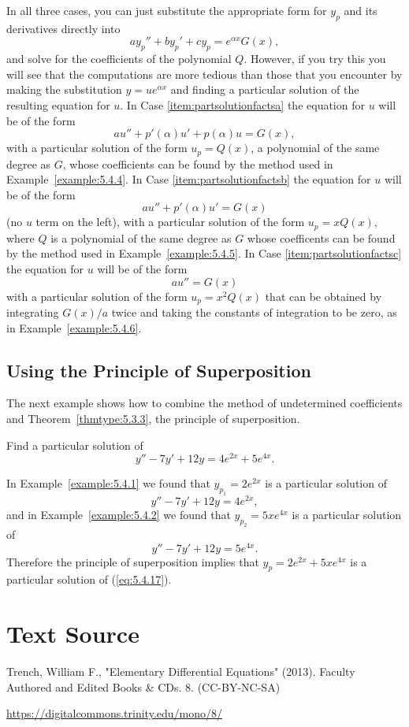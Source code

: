 \documentclass{ximera}
\begin{document}
In all three cases, you can just substitute the appropriate form for
$y_p$ and its derivatives directly into
$$
ay_p''+by_p'+cy_p=e^{\alpha x}G(x),
$$
and solve for the coefficients of the polynomial $Q$. However, if you
try this you will see that the computations are more tedious than
those that you encounter by making the substitution $y=ue^{\alpha x}$
and finding a particular solution of the resulting equation for $u$.
In Case \ref{item:partsolutionfactsa}
the equation for $u$ will be of the form
$$
au''+p'(\alpha)u'+p(\alpha)u=G(x),
$$
with a particular solution of the form $u_p=Q(x)$, a polynomial of the
same degree as $G$, whose coefficients can be found by the method used
in Example~\ref{example:5.4.4}. In Case \ref{item:partsolutionfactsb}  the equation for
$u$ will be of the form
$$
au''+p'(\alpha)u'=G(x)
$$
(no $u$ term on the left), with a particular solution of the form
$u_p=xQ(x)$, where $Q$ is a polynomial of the same degree as $G$ whose
coefficents can be found by the method used in
Example~\ref{example:5.4.5}. In Case \ref{item:partsolutionfactsc}  the equation for $u$
will be of the form
$$
au''=G(x)
$$
with a particular solution of the form $u_p=x^2Q(x)$ that can be
obtained by integrating $G(x)/a$ twice and taking the constants of
integration to be zero, as in Example~\ref{example:5.4.6}.

\subsection*{Using the Principle of Superposition}

The next example shows how to combine the method of undetermined
coefficients and Theorem~\ref{thmtype:5.3.3}, the principle of
superposition.

\begin{example}\label{example:5.4.7}
Find a particular solution of
\begin{equation} \label{eq:5.4.17}
y''-7y'+12y=4e^{2x}+5e^{4x}.
\end{equation}


\begin{explanation}
In Example~\ref{example:5.4.1} we found that $y_{p_1}=2e^{2x}$
is a particular solution of
$$
y''-7y'+12y=4e^{2x},
$$
and in Example~\ref{example:5.4.2} we found that $y_{p_2}=5xe^{4x}$
is a particular solution of
$$
y''-7y'+12y=5e^{4x}.
$$
Therefore the principle of superposition implies that
$y_p=2e^{2x}+5xe^{4x}$ is a particular solution of (\ref{eq:5.4.17}).
\end{explanation}
\end{example}
\section*{Text Source}
Trench, William F., "Elementary Differential Equations" (2013). Faculty Authored and Edited Books \& CDs. 8. (CC-BY-NC-SA)

\href{https://digitalcommons.trinity.edu/mono/8/}{https://digitalcommons.trinity.edu/mono/8/}
\end{document}

